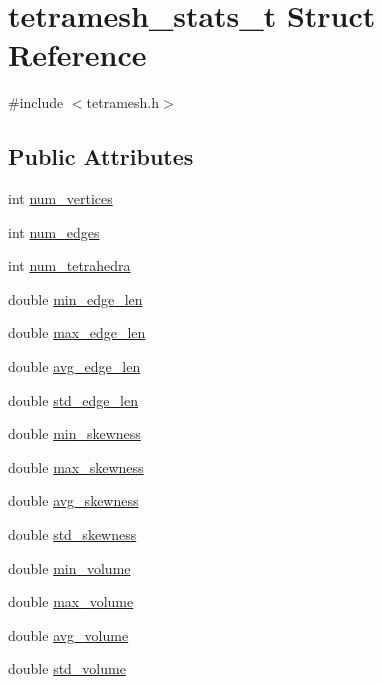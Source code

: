\hypertarget{structtetramesh__stats__t}{
\section{tetramesh\_\-stats\_\-t Struct Reference}
\label{structtetramesh__stats__t}
}


{\ttfamily \#include $<$tetramesh.h$>$}

\subsection*{Public Attributes}
\begin{DoxyCompactItemize}
\item 
int \hyperlink{structtetramesh__stats__t_afecaa443ff6ccbc339cd48489fd7d951}{num\_\-vertices}
\item 
int \hyperlink{structtetramesh__stats__t_ad06580f872ca515cd1c04d754bb5ac77}{num\_\-edges}
\item 
int \hyperlink{structtetramesh__stats__t_ab6de8284b2d47a329cb4643a63cf6b93}{num\_\-tetrahedra}
\item 
double \hyperlink{structtetramesh__stats__t_a7131c4aa8b3d666903351244a5fe2179}{min\_\-edge\_\-len}
\item 
double \hyperlink{structtetramesh__stats__t_adc9d72666ebb6eae6e3f85aab6c24216}{max\_\-edge\_\-len}
\item 
double \hyperlink{structtetramesh__stats__t_a1bda0dc1342c6129540352be52225899}{avg\_\-edge\_\-len}
\item 
double \hyperlink{structtetramesh__stats__t_aaa14821109fcd2cdf49ed8e4cc368167}{std\_\-edge\_\-len}
\item 
double \hyperlink{structtetramesh__stats__t_ab8fca538ff420261d9b95f5fa9ddea1e}{min\_\-skewness}
\item 
double \hyperlink{structtetramesh__stats__t_a4ec194b967fa534a6f0ce194399166b1}{max\_\-skewness}
\item 
double \hyperlink{structtetramesh__stats__t_aa73891c1f7b2e88fb4f097e813e4ea9c}{avg\_\-skewness}
\item 
double \hyperlink{structtetramesh__stats__t_a57c699b5d94bebb33b726773fa8e7997}{std\_\-skewness}
\item 
double \hyperlink{structtetramesh__stats__t_a3da25e8cfd25d3c5db9797dfa56ba830}{min\_\-volume}
\item 
double \hyperlink{structtetramesh__stats__t_affe8b399e5ea71886bf947afb971afd0}{max\_\-volume}
\item 
double \hyperlink{structtetramesh__stats__t_a6a39a6301b2257aba7e438f8087340da}{avg\_\-volume}
\item 
double \hyperlink{structtetramesh__stats__t_a398e67e0fff1c301ce3be6b840518851}{std\_\-volume}
\end{DoxyCompactItemize}



